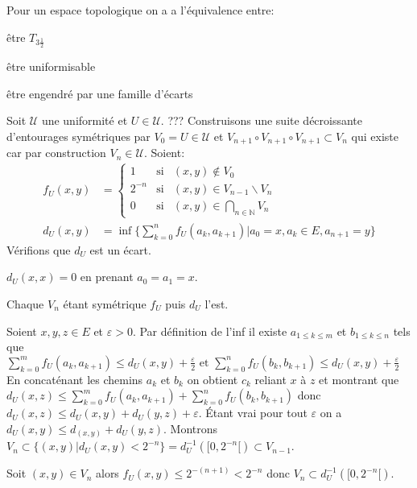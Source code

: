 \documentclass[a4paper, 11pt, french]{book}
\newenvironment{itemise}{\itemize}{\enditemize}
\theoremstyle{plain} %
\theoremstyle{definition} %
\theoremstyle{remark} %
\renewcommand{\setminus}{\backslash}
\newcommand{\1}{\mathds{1}}
\newcommand{\infegal}{\leqslant}
\newcommand{\inv}[1]{#1^{-1}}
\newcommand\et{\text{ et }}
\newcommand{\N}{\mathbb{N}}
\begin{document}
\proposition
Pour un espace topologique on a a l'équivalence entre:
\begin{itemise}
	\item être $T_{3\frac{1}{2}}$
	\item être uniformisable
	\item être engendré par une famille d'écarts
\end{itemise}
\demonstration
\begin{itemise}
	\item Soit $\mathscr{U}$ une uniformité et $U\in\mathscr{U}$. {\color{red} ???}
	Construisons une suite décroissante d'entourages symétriques par $V_0=U\in\mathscr{U}$ et $V_{n+1}\circ V_{n+1}\circ V_{n+1}\subset V_n$ qui existe car par construction $V_n\in\mathscr{U}$.
	Soient:
	\begin{align*}
		f_U(x, y)&=
		\left\{\begin{array}{lll}
			1 & \text{si} & (x, y)\notin V_0 \\
			2^{-n} & \text{si} & (x, y)\in V_{n-1}\setminus V_n \\
			0 & \text{si} & (x, y)\in\bigcap_{n\in\N} V_n
		\end{array}\right.\\
		d_U(x, y)&=\inf\{\sum_{k=0}^nf_U(a_k, a_{k+1})|a_0=x, a_k\in E, a_{n+1}=y\}
	\end{align*}
	Vérifions que $d_U$ est un écart.
	\begin{itemise}
		\item $d_U(x,x)=0$ en prenant $a_0=a_1=x$.
		\item Chaque $V_n$ étant symétrique $f_U$ puis $d_U$ l'est.
		\item Soient $x, y, z\in E$ et $\varepsilon>0$.
		Par définition de l'inf il existe $a_{1\infegal k\infegal m}$ et $b_{1\infegal k\infegal n}$ tels que $\sum_{k=0}^mf_U(a_k, a_{k+1})\infegal d_U(x, y)+\frac{\varepsilon}{2}\et \sum_{k=0}^nf_U(b_k, b_{k+1})\infegal d_U(x, y)+\frac{\varepsilon}{2}$
		En concaténant les chemins $a_k$ et $b_k$ on obtient $c_k$ reliant $x$ à $z$ et montrant que $d_U(x, z)\infegal\sum_{k=0}^mf_U(a_k, a_{k+1})+\sum_{k=0}^nf_U(b_k, b_{k+1})$ donc $d_U(x, z)\infegal d_U(x, y)+d_U(y, z)+\varepsilon$.
		Étant vrai pour tout $\varepsilon$ on a $d_U(x, y)\infegal d_(x, y)+d_U(y, z)$.
	\end{itemise}
	Montrons $V_n\subset\{(x, y)|d_U(x, y)<2^{-n}\}=\inv{d_U}([0,2^{-n}[)\subset V_{n-1}$.
	\begin{itemise}
		\item Soit $(x, y)\in V_n$ alors $f_U(x, y)\infegal 2^{-(n+1)}<2^{-n}$ donc $V_n\subset\inv{d_U}([0,2^{-n}[)$.

\end{itemise}
\end{itemise}
\end{document}
